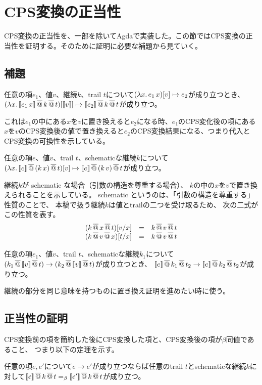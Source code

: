 \section{CPS変換の正当性}
CPS変換の正当性を、一部を除いてAgdaで実装した。この節ではCPS変換の正当性を証明する。そのために証明に必要な補題から見ていく。
\subsection{補題}
\begin{lemma}[CPS変換と代入の可換性]\upshape
  任意の項$e_1$、値$v$、継続$k$、trail $t$について$\LamP{x}{e_1\,x}[v]\mapsto e_2$が成り立つとき、$\LamP{x}{\CPSTh{e_1\,x} \SAppS k \SAppS t}[\CPSTh{v}] \mapsto \CPSTh{e_2} \SAppS k \SAppS t$が成り立つ。
\end{lemma}
これは$e_1$の中にある$x$を$v$に置き換えると$e_2$になる時、$e_1$のCPS変化後の項にある$x$を$v$のCPS変換後の値で置き換えると$e_2$のCPS変換結果になる、つまり代入とCPS変換の可換性を示している。

\begin{lemma}[継続に関する代入演算]\upshape
  任意の項$e$、値$v$、trail $t$、schematicな継続$k$について\\
  $\LamP{x}{\CPSTh{e} \SAppS (k\, x) \SAppS t}[v] \mapsto \CPSTh{e} \SAppS (k\,v) \SAppS t$が成り立つ。
\end{lemma}
継続$k$が schematic な場合（引数の構造を尊重する場合）、
$k$の中の$x$を$v$で置き換えられることを示している。
schematic \cite{DF1992}というのは、「引数の構造を尊重する」性質のことで、
本稿で扱う継続$k$は値とtrailの二つを受け取るため、
次の二式がこの性質を表す。\\
\[
\begin{array}{lcl}
  (k \SAppS x \SAppS t)[\Change{x}{v}] & = & k \SAppS v \SAppS t\\
  (k \SAppS v \SAppS x)[\Change{x}{t}] & = & k \SAppS v \SAppS t\\
\end{array}
\]

\begin{lemma}[継続の簡約に関する補題]\upshape
  任意の項$e_1$、値$v$、trail $t$、schematicな継続$k_1$について\\
  $(k_1 \SAppS \CPSTh{v} \SAppS t) \to (k_2 \SAppS \CPSTh{v} \SAppS t)$が成り立つとき、
  $\CPSTh{e}\SAppS k_1 \SAppS t_2 \to \CPSTh{e}\SAppS k_2 \SAppS t_2$が成り立つ。
\end{lemma}
継続の部分を同じ意味を持つものに置き換え証明を進めたい時に使う。

\subsection{正当性の証明}
CPS変換前の項を簡約した後にCPS変換した項と、CPS変換後の項が$\beta$同値であること、
つまり以下の定理を示す。
\begin{theorem}[正当性の証明]\upshape
  任意の項$e$,$\, e'$について$e \to e'$が成り立つならば任意のtrail $t$とschematicな継続$k$に対して$\CPSTh{e}\SAppS k \SAppS t =_{\beta} \CPSTh{e'} \SAppS k \SAppS t$が成り立つ。
\end{theorem}

